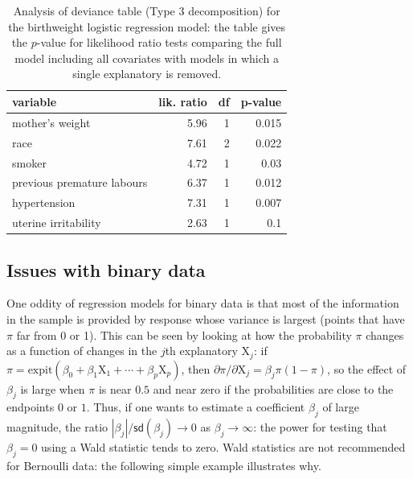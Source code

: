\documentclass[
  11pt,
  letterpaper,
]{book}
\theoremstyle{definition}
\theoremstyle{definition}
\theoremstyle{definition}
\theoremstyle{definition}
\theoremstyle{remark}
\begin{document}
\begin{table}

\caption{\label{tab:type3birthwgt}Analysis of deviance table (Type 3 decomposition) for the birthweight logistic regression model: the table gives the $p$-value for likelihood ratio tests comparing the full model including all covariates with models in which a single explanatory is removed.}
\centering
\begin{tabular}[t]{lrrr}
\toprule
variable & lik. ratio & df & p-value\\
\midrule
mother's weight & 5.96 & 1 & 0.015\\
race & 7.61 & 2 & 0.022\\
smoker & 4.72 & 1 & 0.03\\
previous premature labours & 6.37 & 1 & 0.012\\
hypertension & 7.31 & 1 & 0.007\\
\addlinespace
uterine irritability & 2.63 & 1 & 0.1\\
\bottomrule
\end{tabular}
\end{table}

\hypertarget{issues-with-binary-data}{%
\subsection{Issues with binary data}\label{issues-with-binary-data}}

One oddity of regression models for binary data is that most of the
information in the sample is provided by response whose variance is
largest (points that have \(\pi\) far from 0 or 1). This can be seen by
looking at how the probability \(\pi\) changes as a function of changes in
the \(j\)th explanatory \(\mathrm{X}_j\): if
\(\pi = \mathrm{expit}(\beta_0 + \beta_1\mathrm{X}_1 + \cdots + \beta_p\mathrm{X}_p)\),
then \(\partial \pi/\partial \mathrm{X}_j = \beta_j \pi(1-\pi)\), so the
effect of \(\beta_j\) is large when \(\pi\) is near \(0.5\) and near zero if
the probabilities are close to the endpoints \(0\) or \(1\). Thus, if one
wants to estimate a coefficient \(\beta_j\) of large magnitude, the ratio
\(|\beta_j|/\mathsf{sd}(\beta_j) \to 0\) as \(\beta_j \to \infty\): the
power for testing that \(\beta_j=0\) using a Wald statistic tends to zero.
Wald statistics are not recommended for Bernoulli data: the following
simple example illustrates why.
\end{document}
